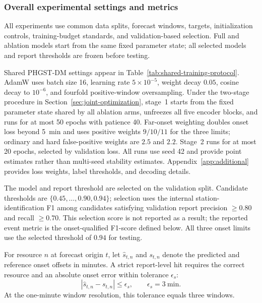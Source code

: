 \documentclass[a4paper,fleqn]{cas-dc}
\begin{document}
\subsubsection{Overall experimental settings and metrics}

All experiments use common data splits, forecast windows, targets, initialization controls, training-budget standards, and validation-based selection. Full and ablation models start from the same fixed parameter state; all selected models and report thresholds are frozen before testing.


Shared PHGST-DM settings appear in Table~\ref{tab:shared-training-protocol}. AdamW uses batch size 16, learning rate $5\times10^{-5}$, weight decay $0.05$, cosine decay to $10^{-6}$, and fourfold positive-window oversampling. Under the two-stage procedure in Section~\ref{sec:joint-optimization}, stage~1 starts from the fixed parameter state shared by all ablation arms, unfreezes all five encoder blocks, and runs for at most 50 epochs with patience 40. Far-onset weighting doubles onset loss beyond 5~min and uses positive weights $9/10/11$ for the three limits; ordinary and hard false-positive weights are $2.5$ and $2.2$. Stage~2 runs for at most 20 epochs, selected by validation loss. All runs use seed 42 and provide point estimates rather than multi-seed stability estimates. Appendix~\ref{app:additional} provides loss weights, label thresholds, and decoding details.

The model and report threshold are selected on the validation split. Candidate thresholds are $\{0.45,\dots,0.90,0.94\}$; selection uses the internal station-identification F1 among candidates satisfying validation report precision $\geq0.80$ and recall $\geq0.70$. This selection score is not reported as a result; the reported event metric is the onset-qualified F1-score defined below. All three onset limits use the selected threshold of $0.94$ for testing.

For resource $n$ at forecast origin $t$, let $\hat s_{t,n}$ and $s_{t,n}$ denote the predicted and reference onset offsets in minutes. A strict report-level hit requires the correct resource and an absolute onset error within tolerance $\epsilon_s$:
\begin{equation}
|\hat{s}_{t,n}-s_{t,n}|\leq\epsilon_s,\qquad
\epsilon_s=3~\mathrm{min}.
\end{equation}
At the one-minute window resolution, this tolerance equals three windows.
\end{document}
